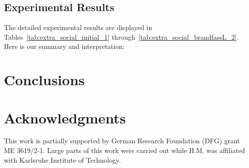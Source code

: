 \documentclass[10pt, conference, compsocconf]{IEEEtran}
\begin{document}
\subsection{Experimental Results}
\label{subsec:results}
%
The detailed experimental results are displayed in Tables~\ref{tab:extra_social_initial_1}
through~\ref{tab:extra_social_brandfassL_2}. Here is our summary and interpretation:


\section{Conclusions}
\label{sec:conclusions}

\section*{Acknowledgments}
%
This work is partially supported by German Research Foundation (DFG) grant ME 3619/2-1.
Large parts of this work were carried out while H.M. was affiliated with Karls\-ruhe
Institute of Technology.



                                     
\end{document}
